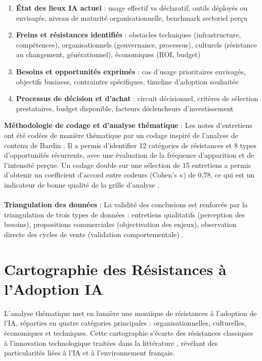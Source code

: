 \begin{enumerate}
    \item \textbf{État des lieux IA actuel} : usage effectif vs déclaratif, outils déployés ou envisagés, niveau de maturité organisationnelle, benchmark sectoriel perçu
    \item \textbf{Freins et résistances identifiés} : obstacles techniques (infrastructure, compétences), organisationnels (gouvernance, processus), culturels (résistance au changement, générationnel), économiques (ROI, budget)
    \item \textbf{Besoins et opportunités exprimés} : cas d'usage prioritaires envisagés, objectifs business, contraintes spécifiques, timeline d'adoption souhaitée
    \item \textbf{Processus de décision et d'achat} : circuit décisionnel, critères de sélection prestataires, budget disponible, facteurs déclencheurs d'investissement
\end{enumerate}
\medskip
\textbf{Méthodologie de codage et d'analyse thématique} : 
Les notes d'entretiens ont été codées de manière thématique par un codage inspiré de l'analyse de contenu de Bardin \cite{bardin2013analyse}. Il a permis d'identifier 12 catégories de résistances et 8 types d'opportunités récurrents, avec une évaluation de la fréquence d'apparition et de l'intensité perçue. Un codage double sur une sélection de 15 entretiens a permis d'obtenir un coefficient d'accord entre codeurs (Cohen's $\kappa$) de 0,78, ce qui est un indicateur de bonne qualité de la grille d'analyse \cite{cohen1960coefficient}.
\\\\
\textbf{Triangulation des données} : La validité des conclusions est renforcée par la triangulation de trois types de données : entretiens qualitatifs (perception des besoins), propositions commerciales (objectivation des enjeux), observation directe des cycles de vente (validation comportementale) \cite{denzin2017research}.

\section{Cartographie des Résistances à l'Adoption IA}

L'analyse thématique met en lumière une mosaïque de résistances à l'adoption de l'IA, réparties en quatre catégories principales : organisationnelles, culturelles, économiques et techniques. Cette cartographie s'écarte des résistances classiques à l'innovation technologique traitées dans la littérature \cite{ram1987consumer}, révélant des particularités liées à l'IA et à l'environnement français.

